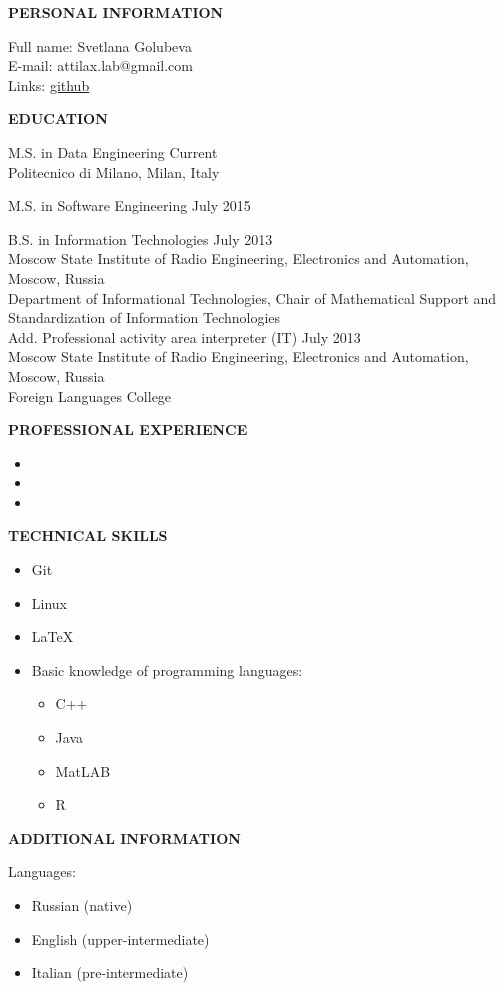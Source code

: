 \documentclass[a4paper,12pt,fullpage]{article}
\begin{document}
\begin{center}
	\textbf{PERSONAL INFORMATION\\}
\end{center}
Full name: \hfill Svetlana Golubeva\\
E-mail: \hfill attilax.lab@gmail.com \\
Links: \hfill  \href{https://github.com/attillax}{github}\\

\begin{center}
	\textbf{EDUCATION}
\end{center}	

M.S. in Data Engineering \hfill Current\\
Politecnico di Milano, Milan, Italy

M.S. in Software Engineering \hfill July 2015

B.S. in Information Technologies \hfill July 2013\\
Moscow State Institute of Radio Engineering, Electronics and Automation, Moscow, Russia\\
Department of Informational Technologies, Chair of Mathematical Support and Standardization of Information Technologies\\

Add. Professional activity area interpreter (IT) \hfill July 2013\\
Moscow State Institute of Radio Engineering, Electronics and Automation, Moscow, Russia\\
Foreign Languages College\\

\begin{center}
	\textbf{PROFESSIONAL EXPERIENCE}
\end{center}	
\begin{itemize}
	\item 
	\item 
	\item 
\end{itemize}

\begin{center}
	\textbf{TECHNICAL SKILLS}
\end{center}
\begin{itemize}
	\item Git
	\item Linux
	\item \LaTeX
	\item Basic knowledge of programming languages: \begin{itemize}
		\item C++
		\item Java
		\item MatLAB
		\item R
\end{itemize}
\end{itemize}

\begin{center}
	\textbf{ADDITIONAL INFORMATION}
\end{center}
Languages: 
\begin{itemize}
	\item Russian (native)
	\item English (upper-intermediate)
	\item Italian (pre-intermediate)
\end{itemize}
\end{document}

